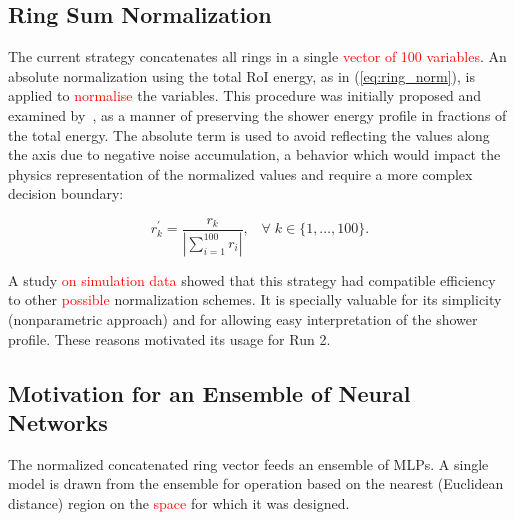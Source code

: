 %

\subsection{Ring Sum Normalization}\label{top:pp}

The current strategy concatenates all rings in a single \textcolor{red}{vector of 100
variables}. An absolute normalization using the total RoI energy, as in
(\ref{eq:ring_norm}), is applied to \textcolor{red}{normalise} the variables. This procedure was
initially proposed and examined by~\cite{1995_seixas_ringer}, as a manner of
preserving the shower energy profile in fractions of the total energy. The
absolute term is used to avoid reflecting the values along the axis due to
negative noise accumulation, a behavior which would impact the physics
representation of the normalized values and require a more complex decision
boundary:

\begin{equation}
  r^\prime_{k} = \frac{r_{k}}{| \sum\limits_{i=1}^{100} r_i
  |}, \;\;\;
    \forall \; k\in\{1,\dots,100\}.
\label{eq:ring_norm}
\end{equation}

A study \textcolor{red}{on simulation data} showed that this strategy had compatible
efficiency to other \textcolor{red}{possible} normalization schemes. It is specially valuable for its
simplicity (nonparametric approach) and for allowing easy interpretation of the
shower profile. These reasons motivated its usage for Run 2.

\subsection{Motivation for an Ensemble of Neural Networks}\label{top:nn_ensemble}

The normalized concatenated ring vector feeds an ensemble of MLPs. A single
model is drawn from the ensemble for operation based on the nearest (Euclidean
distance) region on the \eteta \textcolor{red}{space} for which it was designed.

